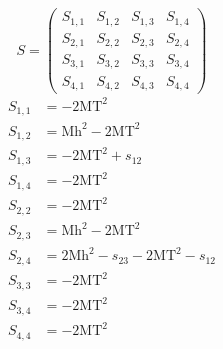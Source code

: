 \documentclass[a4paper]{article}
\begin{document}
\begin{equation}
S=\left(\begin{array}{cccc}
   S_{1,1}&
   S_{1,2}&
   S_{1,3}&
   S_{1,4}\\
   S_{2,1}&
   S_{2,2}&
   S_{2,3}&
   S_{2,4}\\
   S_{3,1}&
   S_{3,2}&
   S_{3,3}&
   S_{3,4}\\
   S_{4,1}&
   S_{4,2}&
   S_{4,3}&
   S_{4,4}\end{array}\right)
\end{equation}
\begin{subequations}
\begin{align}
   S_{1,1}&=-2\text{MT}^2\\
   S_{1,2}&=\text{Mh}^2-2\text{MT}^2\\
   S_{1,3}&=-2\text{MT}^2+s_{12}\\
   S_{1,4}&=-2\text{MT}^2\\
   S_{2,2}&=-2\text{MT}^2\\
   S_{2,3}&=\text{Mh}^2-2\text{MT}^2\\
   S_{2,4}&=2\text{Mh}^2-s_{23}-2\text{MT}^2-s_{12}\\
   S_{3,3}&=-2\text{MT}^2\\
   S_{3,4}&=-2\text{MT}^2\\
   S_{4,4}&=-2\text{MT}^2
\end{align}
\end{subequations}
\end{document}
